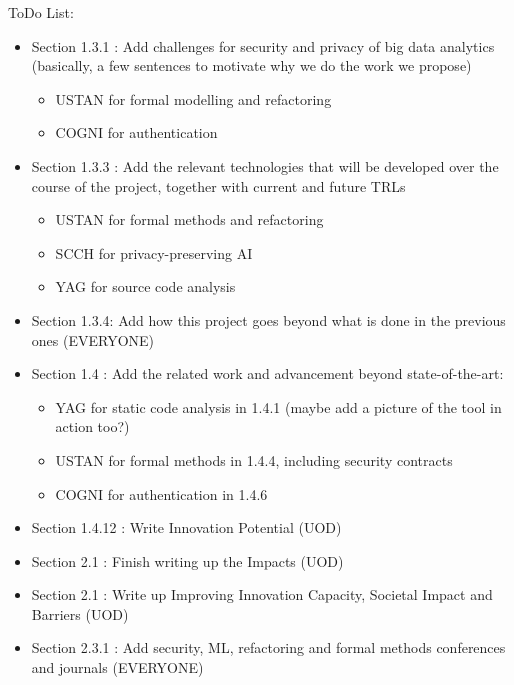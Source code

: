 \documentclass[a4paper,11pt]{article}
\begin{document}
\pagebreak

ToDo List:

\begin{itemize}

\item Section 1.3.1 : Add challenges for security and privacy of big data analytics (basically, a few sentences to motivate why we do the work we propose)

\begin{itemize}
\item USTAN for formal modelling and refactoring
\item COGNI for authentication
\end{itemize}

\item Section 1.3.3 : Add the relevant technologies that will be developed over the course of the project, together with current and future TRLs
\begin{itemize}
\item USTAN for formal methods and refactoring
\item SCCH for privacy-preserving AI
\item YAG for source code analysis
\end{itemize}

\item Section 1.3.4: Add how this project goes beyond what is done in the previous ones (EVERYONE)

\item Section 1.4 : Add the related work and advancement beyond state-of-the-art:
\begin{itemize}
\item YAG for static code analysis in 1.4.1 (maybe add a picture of the tool in action too?)
\item USTAN for formal methods in 1.4.4, including security contracts
\item COGNI for authentication in 1.4.6
\end{itemize}

	
\item Section 1.4.12 : Write Innovation Potential (UOD)

\item Section 2.1 : Finish writing up the Impacts (UOD)

\item Section 2.1 : Write up Improving Innovation Capacity, Societal Impact and Barriers (UOD)

\item Section 2.3.1 : Add security, ML, refactoring and formal methods conferences and journals (EVERYONE)


\end{itemize}
\end{document}
